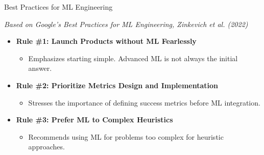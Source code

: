 \documentclass{beamer}
\begin{document}
\begin{frame}{Best Practices for ML Engineering}

\textit{Based on Google's Best Practices for ML Engineering, Zinkevich et al. (2022)}

\begin{itemize}
  \item \textbf{Rule \#1: Launch Products without ML Fearlessly}
    \begin{itemize}
      \item Emphasizes starting simple. Advanced ML is not always the initial answer.
    \end{itemize}

  \item \textbf{Rule \#2: Prioritize Metrics Design and Implementation}
    \begin{itemize}
      \item Stresses the importance of defining success metrics before ML integration.
    \end{itemize}

  \item \textbf{Rule \#3: Prefer ML to Complex Heuristics}
    \begin{itemize}
      \item Recommends using ML for problems too complex for heuristic approaches.
    \end{itemize}
\end{itemize}

\end{frame}
\end{document}
